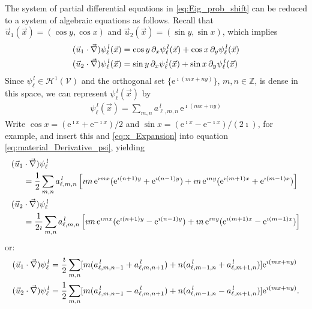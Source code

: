 \documentclass{article}
\newcommand{\e}{\mathrm{e}}
\newcommand{\Hc}{\mathcal{H}}
\newcommand{\Vc}{\mathcal{V}}
\newcommand{\0}{\mathbf{0}}
\newcommand{\1}{\mathbf{1}}
\newcommand{\2}{\mathbf{2}}
\newcommand{\3}{\mathbf{3}}
\newcommand{\4}{\mathbf{4}}
\newcommand{\5}{\mathbf{5}}
\newcommand{\6}{\mathbf{6}}
\newcommand{\7}{\mathbf{7}}
\newcommand{\8}{\mathbf{8}}
\begin{document}
The system of partial differential equations in
\eqref{eq:Eig_prob_shift} can be reduced to a system of algebraic
equations as follows. Recall that
$\vec{u}_1(\vec{x})=(\cos{y},\cos{x})$ and
$\vec{u}_2(\vec{x})=(\sin{y},\sin{x})$, which implies 
%
\begin{align}\label{eq:material_Derivative_psi}
  (\vec{u}_1\cdot\vec{\nabla})\psi_\ell^{\,l}(\vec{x})
          &=\cos{y}\,\partial_x\psi_\ell^{\,l}(\vec{x})+\cos{x}\,\partial_y\psi_\ell^{\,l}(\vec{x})\\
  (\vec{u}_2\cdot\vec{\nabla})\psi_\ell^{\,l}(\vec{x})
          &=\sin{y}\,\partial_x\psi_\ell^{\,l}(\vec{x})+\sin{x}\,\partial_y\psi_\ell^{\,l}(\vec{x})\notag
\end{align}
%
Since $\psi_\ell^{\,l}\in\Hc^1(\Vc)$ and the orthogonal set $\{\e^{\imath (mx+ny)}\}$,
$m,n\in\mathbb{Z}$, is dense in this space, we can represent
$\psi_\ell^{\,l}(\vec{x})$ by
%
\begin{align}\label{eq:x_Expansion}
  \psi_\ell^{\,l}(\vec{x})=\sum_{m,n}a^{\,l}_{\ell,m,n}\,\e^{\imath (mx+ny)}
\end{align}
%
Write $\cos{x}=(\e^{\imath x}+\e^{-\imath x})/2$ and
$\sin{x}=(\e^{\imath x}-\e^{-\imath x})/(2\imath)$, for example, and insert this
and \eqref{eq:x_Expansion} into equation
\eqref{eq:material_Derivative_psi}, yielding
%
\begin{align}\label{eq:Advection_Fourier}
  (\vec{u}_1&\cdot\vec{\nabla})\psi_\ell^{\,l}\\
    &=\frac{1}{2}\sum_{m,n}a^{\,l}_{\ell,m,n}\left[
        \imath m\,\e^{\imath mx}(\e^{\imath(n+1)y}+\e^{\imath(n-1)y})
        +\imath n\,\e^{\imath ny}(\e^{\imath(m+1)x}+\e^{\imath(m-1)x})
                       \right]
    \notag\\
%    
  (\vec{u}_2&\cdot\vec{\nabla})\psi_\ell^{\,l}\notag\\
    &=\frac{1}{2\imath}\sum_{m,n}a^{\,l}_{\ell,m,n}\left[
        \imath m\,\e^{\imath mx}(\e^{\imath(n+1)y}-\e^{\imath(n-1)y})
        +\imath n\,\e^{\imath ny}(\e^{\imath(m+1)x}-\e^{\imath(m-1)x})
                       \right]
                       \notag
\end{align}
%
or:
%
\begin{align}\label{eq:Algebraic_advection}
  (\vec{u}_1\cdot\vec{\nabla})\psi_\ell^{\,l}
    &=\frac{\imath}{2}\sum_{m,n}
    [m(a^{\,l}_{\ell,m,n-1}+a^{\,l}_{\ell,m,n+1})+n(a^{\,l}_{\ell,m-1,n}+a^{\,l}_{\ell,m+1,n})]\e^{\imath (mx+ny)}
   \notag\\
  (\vec{u}_2\cdot\vec{\nabla})\psi_\ell^{\,l}
    &=\frac{1}{2}\sum_{m,n}
    [m(a^{\,l}_{\ell,m,n-1}-a^{\,l}_{\ell,m,n+1})+n(a^{\,l}_{\ell,m-1,n}-a^{\,l}_{\ell,m+1,n})]\e^{\imath (mx+ny)} .
\end{align}
\end{document}
